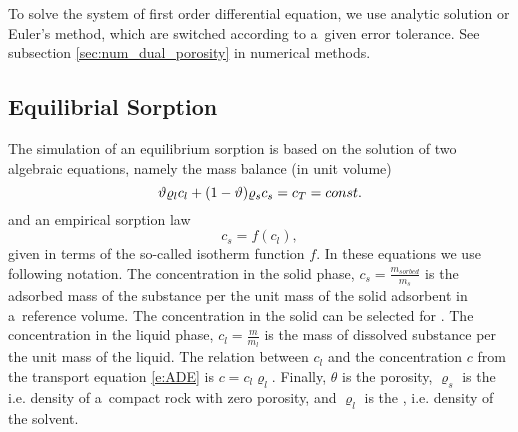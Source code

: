 To solve the system of first order differential equation, we use analytic solution or Euler's method,
which are switched according to a~given error tolerance. See subsection \ref{sec:num_dual_porosity} 
in numerical methods.
 

\subsection{Equilibrial Sorption}
\label{sec:sorp_math}

The simulation of an equilibrium sorption is based on the solution of two algebraic equations, namely the mass balance (in unit volume)
\begin{equation}
\label{eq:mass_balance_sorption}
\vartheta \varrho_l c_l + (1-\vartheta) \varrho_s c_s = c_T = const.
\end{equation}
and an empirical sorption law
\begin{equation}
\label{eq:relation_cs_cl}
c_s = f(c_l),
\end{equation}
given in terms of the so-called isotherm function $f$.  In these equations we use following notation. 
The concentration in the solid phase, $c_s = \frac{m_{sorbed}}{m_s}$ \units{}{}{} is the adsorbed mass of the substance
per the unit mass of the solid adsorbent in a~reference volume. The concentration
in the solid can be selected for .
The concentration in the liquid phase, $c_l = \frac{m}{m_l}$ \units{}{}{} is the mass of dissolved substance
per the unit mass of the liquid. The relation between $c_l$ and the concentration $c$ from 
       the transport equation \eqref{e:ADE} is $c = c_l \varrho_l$.
 Finally, $\theta$ is the porosity, $\varrho_s$ is the  i.e. density of a~compact rock with zero porosity,
 and $\varrho_l$ is the , i.e. density of the solvent.


